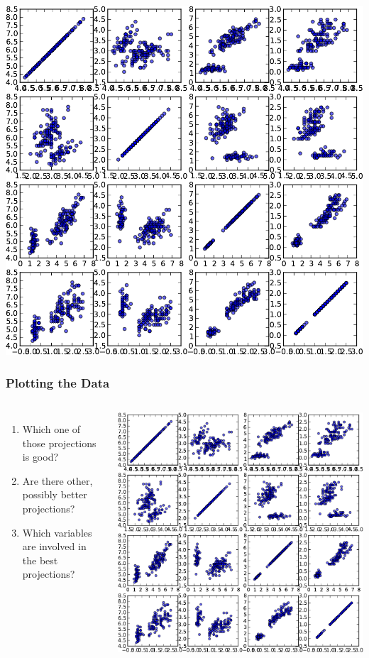 \begin{frame}[plain]
  \begin{center}
   
    \includegraphics[height=.99\textheight]{pca-pics/iris-all-nocolor}

  \end{center}
\end{frame}

\begin{frame}
  \frametitle{Plotting the Data}
  \begin{columns}

    \begin{enumerate}
    \item<1-> Which one of those projections is \alert{good}?
    \item<2-> Are there other, possibly \alert{better} projections?
    \item<3-> \alert{Which variables} are involved in the best
      projections?
    \end{enumerate}
    \includegraphics<1->[width=\linewidth]{pca-pics/iris-all-nocolor}
  \end{columns}
\end{frame}

